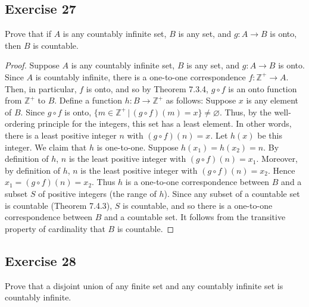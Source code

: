 \documentclass[14pt]{extarticle}
\newcommand{\es}{\varnothing}
\newcommand{\Z}{\mathbb{Z}}
\begin{document}
\subsection{Exercise 27}
Prove that if $A$ is any countably infinite set, $B$ is any set, and \(g: A \to B\) is onto, then $B$ is countable.

\begin{proof}
    Suppose $A$ is any countably infinite set, $B$ is any set, and \(g: A \to B\) is onto. Since $A$ is countably
    infinite, there is a one-to-one correspondence \(f: \Z^+ \to A\). Then, in particular, $f$ is onto, and so by
    Theorem 7.3.4, \(g \circ f\) is an onto function from \(\Z^+\) to $B$. Define a function \(h: B \to \Z^+\) as
    follows: Suppose $x$ is any element of $B$. Since \(g \circ f\) is onto, \(\{m \in \Z^+ \, | \, (g \circ f)(m) = x\}
    \neq \es\). Thus, by the well-ordering principle for the integers, this set has a least element. In other words,
    there is a least positive integer $n$ with \((g \circ f)(n) = x\). Let $h(x)$ be this integer. We claim that $h$ is
    one-to-one. Suppose \(h(x_1) = h(x_2) = n\). By definition of $h$, $n$ is the least positive integer with \((g \circ
    f)(n) = x_1\). Moreover, by definition of $h$, $n$ is the least positive integer with \((g \circ f)(n) = x_2\). Hence
    \(x_1 = (g \circ f)(n) = x_2\). Thus $h$ is a one-to-one correspondence between $B$ and a subset $S$ of positive
    integers (the range of $h$). Since any subset of a countable set is countable (Theorem 7.4.3), $S$ is
    countable, and so there is a one-to-one correspondence between $B$ and a countable set. It follows from the
    transitive property of cardinality that $B$ is countable.
\end{proof}

\subsection{Exercise 28}
Prove that a disjoint union of any finite set and any countably infinite set is countably infinite.
\end{document}
